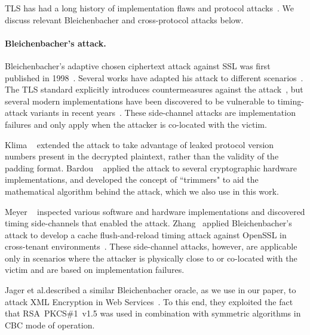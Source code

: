 TLS has had a long history of implementation flaws and protocol attacks~\cite{POODLE,CRIME,RC4biases,Lucky13,BEAST,SLOTH,Durumeric:2014:MH:2663716.2663755}. We discuss relevant Bleichenbacher and cross-protocol attacks below.

\paragraph{Bleichenbacher's attack.}
Bleichenbacher's adaptive chosen ciphertext attack against SSL was first published in 1998~\cite{Bleichenbacher}. Several works have adapted his attack to different scenarios~\cite{klima2003attacking,bardou2012efficient,Jager2012}.
The TLS standard explicitly introduces countermeasures against the attack~\cite{rfc5246}, but several modern implementations have been discovered to be vulnerable to timing-attack variants in recent years~\cite{Meyer14,Zhang:2014:CSA:2660267.2660356}. These side-channel attacks are implementation failures and only apply when the attacker is co-located with the victim.

\ifext
Klima \etal~\cite{klima2003attacking} extended the attack to take advantage of leaked protocol version numbers present in the decrypted plaintext, rather than the validity of the padding format.  Bardou \etal~\cite{bardou2012efficient} applied the attack to several cryptographic hardware implementations, and developed the concept of ``trimmers" to aid the mathematical algorithm behind the attack, which we also use in this work.
\fi

Meyer \etal~\cite{Meyer14} inspected various software and hardware implementations and discovered timing side-channels that enabled the attack. Zhang  \etal~applied Bleichenbacher's attack to develop a cache flush-and-reload timing attack against OpenSSL in cross-tenant environments~\cite{Zhang:2014:CSA:2660267.2660356}. These side-channel attacks, however, are applicable only in scenarios where the attacker is physically close to or co-located with the victim and are based on implementation failures.

Jager et al.\@ described a similar Bleichenbacher oracle, as we use in our paper, to attack XML Encryption in Web Services~\cite{Jager2012}. To this end, they exploited the fact that RSA~PKCS\#1~v1.5 was used in combination with symmetric algorithms in CBC mode of operation.
\fi


